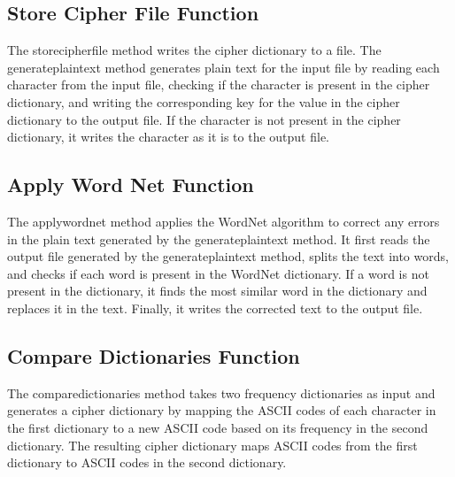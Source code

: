 \documentclass{article}
\begin{document}
\subsection{Store Cipher File Function}
The storecipherfile method writes the cipher dictionary to a file. The generateplaintext method generates plain text for the input file by reading each character from the input file, checking if the character is present in the cipher dictionary, and writing the corresponding key for the value in the cipher dictionary to the output file. If the character is not present in the cipher dictionary, it writes the character as it is to the output file.

\subsection{Apply Word Net Function}
The applywordnet method applies the WordNet algorithm to correct any errors in the plain text generated by the generateplaintext method. It first reads the output file generated by the generateplaintext method, splits the text into words, and checks if each word is present in the WordNet dictionary. If a word is not present in the dictionary, it finds the most similar word in the dictionary and replaces it in the text. Finally, it writes the corrected text to the output file.


\subsection{Compare Dictionaries Function}
The comparedictionaries method takes two frequency dictionaries as input and generates a cipher dictionary by mapping the ASCII codes of each character in the first dictionary to a new ASCII code based on its frequency in the second dictionary. The resulting cipher dictionary maps ASCII codes from the first dictionary to ASCII codes in the second dictionary.
\end{document}
